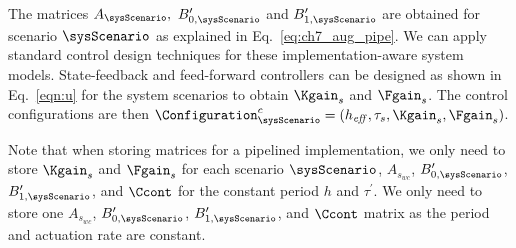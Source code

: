 The matrices $A_{\sysScenario},\ B_{0,\sysScenario}^{\prime}$ and $B_{1,\sysScenario}^{\prime}$ are obtained for scenario $\sysScenario$ as explained in Eq.~\ref{eq:ch7_aug_pipe}.
We can apply standard control design techniques for these implementation-aware system models.
State-feedback and feed-forward controllers can be designed as shown in Eq.~\ref{eqn:u} for the system scenarios to obtain $\Kgain_s$ and $\Fgain_s$.
The control configurations are then $\Configuration_{\sysScenario}^c = (h_{\mathit{eff}},\tau_{s}, \Kgain_{s}, \Fgain_{s})$.

Note that when storing matrices for a pipelined implementation, we only need to store $\Kgain_s$ and $\Fgain_s$ for each scenario $\sysScenario$, $A_{s_{wc}}$, $B_{0,\sysScenario}^{\prime}$, $B_{1,\sysScenario}^{\prime}$, and $\Ccont$ for the constant period $h$ and $\tau^\prime$. We only need to store one $A_{s_{wc}}$, $B_{0,\sysScenario}^{\prime}$, $B_{1,\sysScenario}^{\prime}$, and $\Ccont$ matrix as the period and actuation rate are constant. 